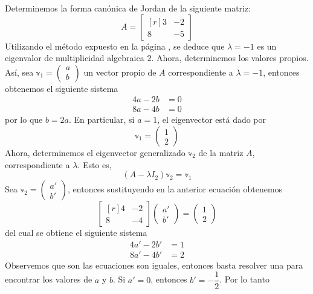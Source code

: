 \begin{example}
    Determinemos la forma canónica de Jordan de la siguiente matriz:
    $$A = \begin{bmatrix*}[r]
        3 & -2 \\
        8 & -5
    \end{bmatrix*}$$
    Utilizando el método expuesto en la página \pageref{metodo_eigen_2x2}, se deduce que $\lambda = -1$ es un eigenvalor de multiplicidad algebraica $2$. Ahora, determinemos los valores propios. Así, sea $\mathbb{v}_1 = \begin{pmatrix} a \\ b \end{pmatrix}$ un vector propio de $A$ correspondiente a $\lambda = -1$, entonces obtenemos el siguiente sistema
    \begin{align*}
        4a - 2b & = 0 \\
        8a - 4b & = 0
    \end{align*}
    por lo que $b = 2a$. En particular, si $a = 1$, el eigenvector está dado por
    $$\mathbb{v}_1 = \begin{pmatrix} 1 \\ 2 \end{pmatrix}$$\newpage\noindent
    Ahora, determinemos el eigenvector generalizado $\mathbb{v}_2$ de la matriz $A$, correspondiente a $\lambda$. Esto es,
    $$(A - \lambda I_2) \mathbb{v}_2 = \mathbb{v}_1$$
    Sea $\mathbb{v}_2 = \begin{pmatrix} a' \\ b' \end{pmatrix}$, entonces sustituyendo en la anterior ecuación obtenemos
    $$\begin{bmatrix*}[r]
        4 & -2 \\
        8 & -4
    \end{bmatrix*} \begin{pmatrix}
        a' \\
        b'
    \end{pmatrix} = \begin{pmatrix}
        1 \\
        2
    \end{pmatrix}$$
    del cual se obtiene el siguiente sistema
    \begin{align*}
        4a' - 2b' & = 1 \\
        8a' - 4b' & = 2
    \end{align*}
    Observemos que son las ecuaciones son iguales, entonces basta resolver una para encontrar los valores de $a$ y $b$. Si $a' = 0$, entonces $b' = - \dfrac{1}{2}$. Por lo tanto

\end{example}
